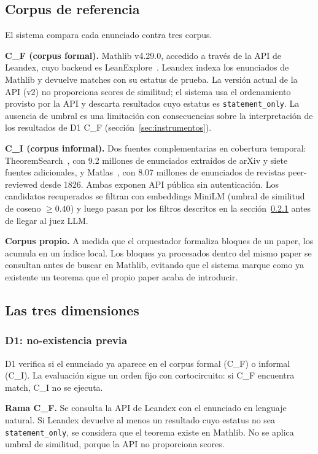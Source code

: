 \documentclass[12pt,a4paper]{article}
\theoremstyle{remark}
\begin{document}
\subsection{Corpus de referencia}

El sistema compara cada enunciado contra tres corpus.

\textbf{C\_F (corpus formal).} Mathlib v4.29.0, accedido a través de la API de Leandex, cuyo backend es LeanExplore~\cite{leanexplore2025}. Leandex indexa los enunciados de Mathlib y devuelve matches con su estatus de prueba. La versión actual de la API (v2) no proporciona scores de similitud; el sistema usa el ordenamiento provisto por la API y descarta resultados cuyo estatus es \texttt{statement\_only}. La ausencia de umbral es una limitación con consecuencias sobre la interpretación de los resultados de D1 C\_F (sección~\ref{sec:instrumentos}).

\textbf{C\_I (corpus informal).} Dos fuentes complementarias en cobertura temporal: TheoremSearch~\cite{theoremsearch2026}, con 9.2 millones de enunciados extraídos de arXiv y siete fuentes adicionales, y Matlas~\cite{matlas2026}, con 8.07 millones de enunciados de revistas peer-reviewed desde 1826. Ambas exponen API pública sin autenticación. Los candidatos recuperados se filtran con embeddings MiniLM (umbral de similitud de coseno $\geq 0.40$) y luego pasan por los filtros descritos en la sección~\ref{ssec:d1} antes de llegar al juez LLM.

\textbf{Corpus propio.} A medida que el orquestador formaliza bloques de un paper, los acumula en un índice local. Los bloques ya procesados dentro del mismo paper se consultan antes de buscar en Mathlib, evitando que el sistema marque como ya existente un teorema que el propio paper acaba de introducir.

\subsection{Las tres dimensiones}

\subsubsection{D1: no-existencia previa}
\label{ssec:d1}

D1 verifica si el enunciado ya aparece en el corpus formal (C\_F) o informal (C\_I). La evaluación sigue un orden fijo con cortocircuito: si C\_F encuentra match, C\_I no se ejecuta.

\textbf{Rama C\_F.} Se consulta la API de Leandex con el enunciado en lenguaje natural. Si Leandex devuelve al menos un resultado cuyo estatus no sea \texttt{statement\_only}, se considera que el teorema existe en Mathlib. No se aplica umbral de similitud, porque la API no proporciona scores.
\end{document}
